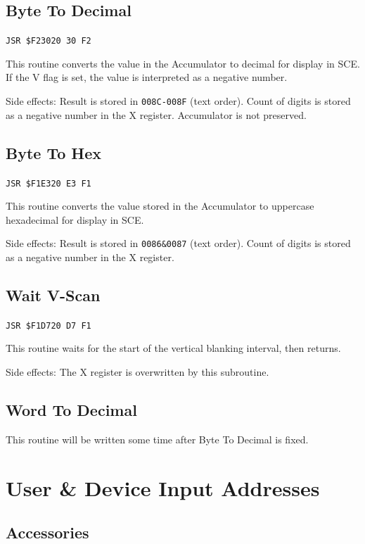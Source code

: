 \documentclass[12pt]{{memoir}}
\begin{document}
\subsection{Byte To Decimal}

\texttt{JSR \$F230}\hfill\texttt{20 30 F2}

This routine converts the value in the Accumulator to decimal for display in SCE. If the V flag is set, the value is interpreted as a negative number.

Side effects: Result is stored in \texttt{008C-008F} (text order). Count of digits is stored as a negative number in the X register. Accumulator is not preserved.

\subsection{Byte To Hex}

\texttt{JSR \$F1E3}\hfill\texttt{20 E3 F1}

This routine converts the value stored in the Accumulator to uppercase hexadecimal for display in SCE.

Side effects: Result is stored in \texttt{0086\&0087} (text order). Count of digits is stored as a negative number in the X register.

\subsection{Wait V-Scan}

\texttt{JSR \$F1D7}\hfill\texttt{20 D7 F1}

This routine waits for the start of the vertical blanking interval, then returns. 

Side effects: The X register is overwritten by this subroutine.

\subsection{Word To Decimal}

This routine will be written some time after Byte To Decimal is fixed.

\section{User \& Device Input Addresses}
\label{sec:userinput}

\subsection{Accessories}
\end{document}
